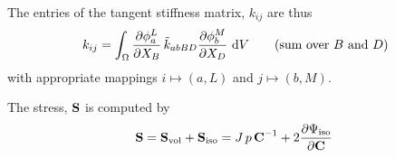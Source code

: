 The entries of the tangent stiffness matrix, $k_{ij}$ are thus
\begin{equation*}
  \begin{array}{lll}
    k_{ij} = \ds\int_\Omega \p{\phi_a^L}{X_B}\tilde{k}_{abBD}\p{\phi_b^M}{X_D}\,\d V \qquad \text{(sum over $B$ and $D$)}
  \end{array}
\end{equation*}
with appropriate mappings $i \mapsto (a,L)$ and $j \mapsto (b,M)$.

The stress, $\textbf{S}$ is computed by
\begin{equation*}
  \begin{array}{lll}
    \bfS = \bfS_\text{vol} + \bfS_\text{iso} = J\,p\,\bfC^{-1} + 2\p{\Psi_\text{iso}}{\bfC}
  \end{array}
\end{equation*}

